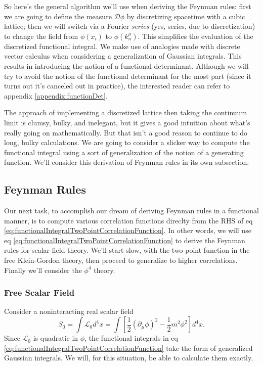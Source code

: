 So here's the general algorithm we'll use when deriving the
Feynman rules: first we are going to define the measure
$\mathcal{D}\phi$ by discretizing spacetime with a cubic lattice;
then we will switch via a Fourier \emph{series} (yes, series, due
to discretization) to change the field from $\phi(x_i)$ to
$\phi(k^{\mu}_{n})$. This simplifies the evaluation of the
discretized functional integral. We make use of analogies made
with discrete vector calculus when considering a generalization
of Gaussian integrals. This results in introducing the notion of
a functional determinant. Although we will try to avoid the
notion of the functional determinant for the most part (since it
turns out it's canceled out in practice), the interested reader
can refer to appendix \ref{appendix:functionDet}.

The approach of implementing a discretized lattice then taking
the continuum limit is clumsy, bulky, and inelegant, but it gives
a good intuition about what's really going on mathematically. But
that isn't a good reason to continue to do long, bulky
calculations. We are going to consider a slicker way to compute
the functional integral using a sort of generalization of the
notion of a generating function. We'll consider this derivation
of Feynman rules in its own subsection.

\subsection{Feynman Rules}

Our next task, to accomplish our dream of deriving Feynman rules
in a functional manner, is to compute various correlation
functions direclty from the RHS of eq \eqref{eq:functionalIntegralTwoPointCorrelationFunction}.
In other words, we will use eq
\eqref{eq:functionalIntegralTwoPointCorrelationFunction} to
derive the Feynman rules for scalar field theory. We'll start
slow, with the two-point function in the free Klein-Gordon
theory, then proceed to generalize to higher
correlations. Finally we'll consider the $\phi^{4}$ theory.

\subsubsection{Free Scalar Field} Consider a noninteracting real
scalar field
\begin{equation}\label{eq:actionFreeScalarField}
S_{0} = \int\mathcal{L}_{0}d^{4}x = \int[\frac{1}{2}(\partial_{\mu}\phi)^2-\frac{1}{2}m^{2}\phi^{2}]d^{4}x.
\end{equation}
Since $\mathcal{L}_{0}$ is quadratic in $\phi$, the functional
integrals in eq
\eqref{eq:functionalIntegralTwoPointCorrelationFunction} take the
form of generalized Gaussian integrals. We will, for this
situation, be able to calculate them exactly.


